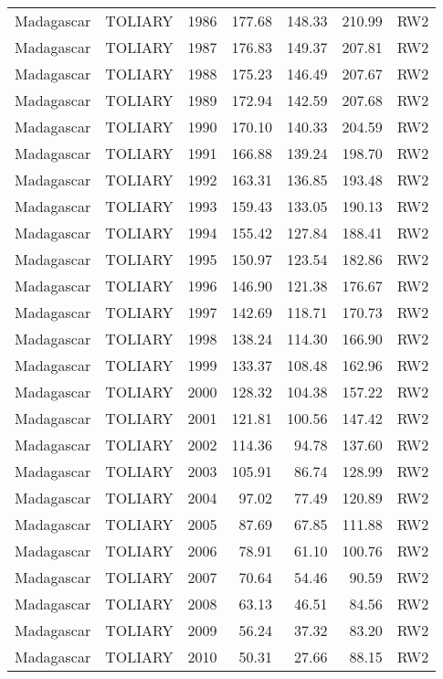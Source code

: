\begin{longtable}{lllrrrl}
  Madagascar & TOLIARY & 1986 & 177.68 & 148.33 & 210.99 & RW2 \\ 
  Madagascar & TOLIARY & 1987 & 176.83 & 149.37 & 207.81 & RW2 \\ 
  Madagascar & TOLIARY & 1988 & 175.23 & 146.49 & 207.67 & RW2 \\ 
  Madagascar & TOLIARY & 1989 & 172.94 & 142.59 & 207.68 & RW2 \\ 
  Madagascar & TOLIARY & 1990 & 170.10 & 140.33 & 204.59 & RW2 \\ 
  Madagascar & TOLIARY & 1991 & 166.88 & 139.24 & 198.70 & RW2 \\ 
  Madagascar & TOLIARY & 1992 & 163.31 & 136.85 & 193.48 & RW2 \\ 
  Madagascar & TOLIARY & 1993 & 159.43 & 133.05 & 190.13 & RW2 \\ 
  Madagascar & TOLIARY & 1994 & 155.42 & 127.84 & 188.41 & RW2 \\ 
  Madagascar & TOLIARY & 1995 & 150.97 & 123.54 & 182.86 & RW2 \\ 
  Madagascar & TOLIARY & 1996 & 146.90 & 121.38 & 176.67 & RW2 \\ 
  Madagascar & TOLIARY & 1997 & 142.69 & 118.71 & 170.73 & RW2 \\ 
  Madagascar & TOLIARY & 1998 & 138.24 & 114.30 & 166.90 & RW2 \\ 
  Madagascar & TOLIARY & 1999 & 133.37 & 108.48 & 162.96 & RW2 \\ 
  Madagascar & TOLIARY & 2000 & 128.32 & 104.38 & 157.22 & RW2 \\ 
  Madagascar & TOLIARY & 2001 & 121.81 & 100.56 & 147.42 & RW2 \\ 
  Madagascar & TOLIARY & 2002 & 114.36 & 94.78 & 137.60 & RW2 \\ 
  Madagascar & TOLIARY & 2003 & 105.91 & 86.74 & 128.99 & RW2 \\ 
  Madagascar & TOLIARY & 2004 & 97.02 & 77.49 & 120.89 & RW2 \\ 
  Madagascar & TOLIARY & 2005 & 87.69 & 67.85 & 111.88 & RW2 \\ 
  Madagascar & TOLIARY & 2006 & 78.91 & 61.10 & 100.76 & RW2 \\ 
  Madagascar & TOLIARY & 2007 & 70.64 & 54.46 & 90.59 & RW2 \\ 
  Madagascar & TOLIARY & 2008 & 63.13 & 46.51 & 84.56 & RW2 \\ 
  Madagascar & TOLIARY & 2009 & 56.24 & 37.32 & 83.20 & RW2 \\ 
  Madagascar & TOLIARY & 2010 & 50.31 & 27.66 & 88.15 & RW2 \\ 

\end{longtable}
